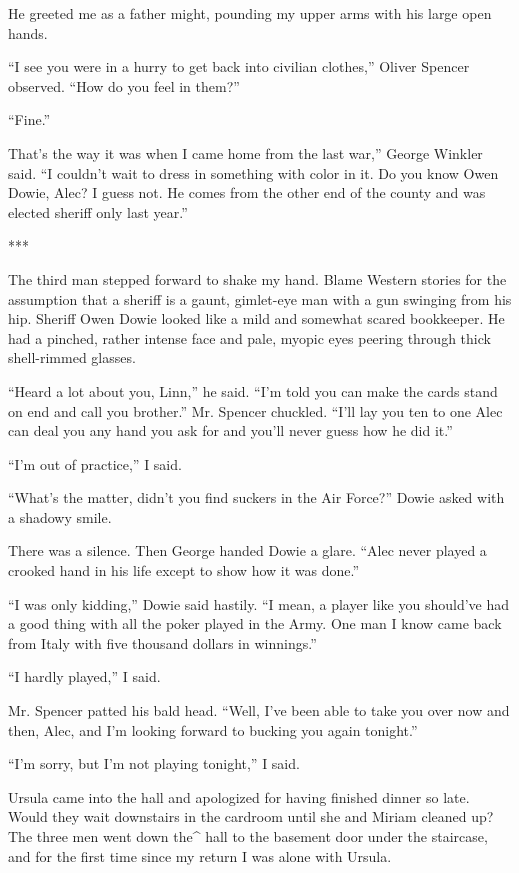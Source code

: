 {He greeted me as a father might, pounding my upper arms with his large open hands.

“I see you were in a hurry to get back into civilian clothes,” Oliver Spencer observed. “How do you feel in them?”

“Fine.”

That’s the way it was when I came home from the last war,” George Winkler said. “I couldn’t wait to dress in something with color in it. Do you know Owen Dowie, Alec? I guess not. He comes from the other end of the county and was elected sheriff only last year.”

***

The third man stepped forward to shake my hand. Blame Western stories for the assumption that a sheriff is a gaunt, gimlet-eye man with a gun swinging from his hip. Sheriff Owen Dowie looked like a mild and somewhat scared bookkeeper. He had a pinched, rather intense face and pale, myopic eyes peering through thick shell-rimmed glasses.

“Heard a lot about you, Linn,” he said. “I’m told you can make the cards stand on end and call you brother.” Mr. Spencer chuckled. “I’ll lay you ten to one Alec can deal you any hand you ask for and you’ll never guess how he did it.”

“I’m out of practice,” I said.

“What’s the matter, didn’t you find suckers in the Air Force?” Dowie asked with a shadowy smile.

There was a silence. Then George handed Dowie a glare. “Alec never played a crooked hand in his life except to show how it was done.”

“I was only kidding,” Dowie said hastily. “I mean, a player like you should’ve had a good thing with all the poker played in the Army. One man I know came back from Italy with five thousand dollars in winnings.”

“I hardly played,” I said.

Mr. Spencer patted his bald head. “Well, I’ve been able to take you over now and then, Alec, and I’m looking forward to bucking you again tonight.”

“I’m sorry, but I’m not playing tonight,” I said.

Ursula came into the hall and apologized for having finished dinner so late. Would they wait downstairs in the cardroom until she and Miriam cleaned up? The three men went down the^ hall to the basement door under the staircase, and for the first time since my return I was alone with Ursula.

}
